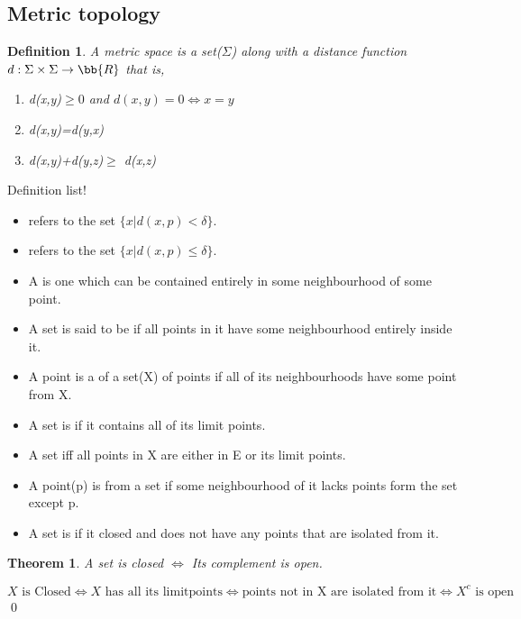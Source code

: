 \documentclass{myclass}
\newtheorem*{definition}{Definition}
\newtheorem*{theorem}{Theorem}
\begin{document}
\subsection{Metric topology}

\begin{definition}
    A metric space is a set($\Sigma$) along with a distance function $d:\Sigma\times\Sigma\to \bb{R} $  that is,
    \begin{enumerate}
        \item {} d(x,y)$\geq 0$ and $d(x,y)=0\iff x=y$
        \item {} d(x,y)=d(y,x)
        \item {} d(x,y)+d(y,z)$\geq$ d(x,z)
    \end{enumerate}
\end{definition}

\begin{purplebox}{Definition list!}
    \begin{itemize}
        \item {} refers to the set $\{x|d(x,p)<\delta\}$.
        \item {} refers to the set $\{x|d(x,p)\leq\delta\}$.
        \item A  is one which can be contained entirely in some neighbourhood of some point.
        \item A set is said to be  if all points in it have some neighbourhood entirely inside it.
        \item A point is a  of a set(X) of points if all of its neighbourhoods have some point from X.
        \item A set is  if it contains all of its limit points.
        \item A set  iff all points in X are either in E or its limit points.
        \item A point(p) is  from a set if some neighbourhood of it lacks points form the set except p.
        \item A set is  if it closed and does not have any points that are isolated from it.
    \end{itemize}
\end{purplebox}

\begin{theorem}
    A set is closed $\iff$ Its complement is open. 
\end{theorem}
\begin{prf}
    $$X\text{ is Closed}\iff X \text{ has all its limitpoints}\iff \text{points not in X are isolated from it}\iff X^c\text{ is open}$$
    \qed
\end{prf}
\end{document}

